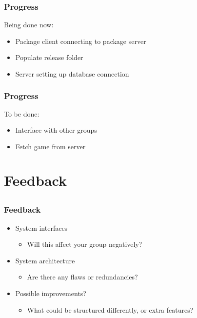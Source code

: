 \documentclass{beamer}
\begin{document}
\begin{frame}
    \frametitle{Progress}
    
    Being done now:
    
    \begin{itemize}
        \item   Package client connecting to package server
        \item   Populate release folder
        \item   Server setting up database connection
    \end{itemize}
\end{frame}

\begin{frame}
    \frametitle{Progress}
    
    To be done:
    
    \begin{itemize}
        \item   Interface with other groups
        \item   Fetch game from server
    \end{itemize}
\end{frame}

\section{Feedback} %
\subsection{}

\begin{frame}
    \frametitle{Feedback}
    
    \begin{itemize}
        \item   System interfaces
        \begin{itemize}
            \item   Will this affect your group negatively?
        \end{itemize}
        \item   System architecture
        \begin{itemize}
            \item   Are there any flaws or redundancies?
        \end{itemize}
        \item   Possible improvements?
        \begin{itemize}
            \item   What could be structured differently, or extra features?
        \end{itemize}
    \end{itemize}
\end{frame}
\end{document}
